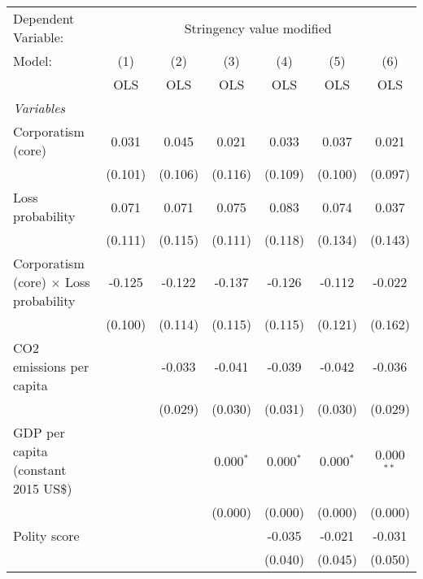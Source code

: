 
\begingroup
\centering
\begin{tabular}{lcccccc}
   \toprule
   Dependent Variable: & \multicolumn{6}{c}{Stringency value modified}\\
   Model:                                        & (1)     & (2)     & (3)         & (4)         & (5)         & (6)\\  
                                                 &  OLS    & OLS     & OLS         & OLS         & OLS         & OLS\\  
   \midrule
   \emph{Variables}\\
   Corporatism (core)                            & 0.031   & 0.045   & 0.021       & 0.033       & 0.037       & 0.021\\   
                                                 & (0.101) & (0.106) & (0.116)     & (0.109)     & (0.100)     & (0.097)\\   
   Loss probability                              & 0.071   & 0.071   & 0.075       & 0.083       & 0.074       & 0.037\\   
                                                 & (0.111) & (0.115) & (0.111)     & (0.118)     & (0.134)     & (0.143)\\   
   Corporatism (core) $\times$ Loss probability  & -0.125  & -0.122  & -0.137      & -0.126      & -0.112      & -0.022\\   
                                                 & (0.100) & (0.114) & (0.115)     & (0.115)     & (0.121)     & (0.162)\\   
   CO2 emissions per capita                      &         & -0.033  & -0.041      & -0.039      & -0.042      & -0.036\\   
                                                 &         & (0.029) & (0.030)     & (0.031)     & (0.030)     & (0.029)\\   
   GDP per capita (constant 2015 US\$)           &         &         & 0.000$^{*}$ & 0.000$^{*}$ & 0.000$^{*}$ & 0.000$^{**}$\\   
                                                 &         &         & (0.000)     & (0.000)     & (0.000)     & (0.000)\\   
   Polity score                                  &         &         &             & -0.035      & -0.021      & -0.031\\   
                                                 &         &         &             & (0.040)     & (0.045)     & (0.050)\\   

\end{tabular}
